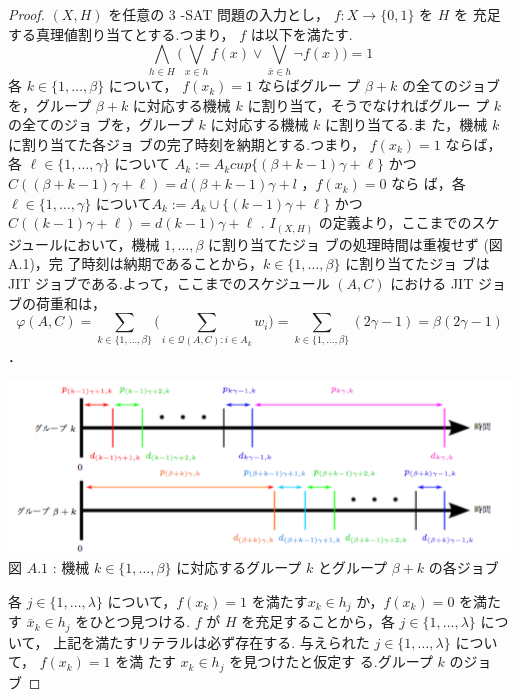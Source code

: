 \documentclass[12pt]{optlab-bachelor}
\begin{document}
\begin{proof}
  $(X,H)$ を任意の 3 -SAT 問題の入力とし， $f : X \to \{0,1\}$ を $H$ を
  充足する真理値割り当てとする.つまり， $f$ は以下を満たす.
  $$\displaystyle \bigwedge_{h \in H} \bigg(\bigvee_{x \in h}f(x) \lor
  \bigvee_{\bar x \in h}\lnot f(x) \bigg) = 1$$
  各 $k \in \{1,\ldots, \beta\}$ について， $f(x_k) = 1$ ならばグルー
  プ $\beta + k$ の全てのジョブを，グループ $\beta + k$ に対応する機械
  $k$ に割り当て，そうでなければグルー
  プ $k$ の全てのジョ ブを，グループ $k$ に対応する機械 $k$ に割り当てる.ま
  た，機械 $k$ に割り当てた各ジョ ブの完了時刻を納期とする.つまり，
  $f(x_k) = 1$ ならば，各 $\ell \in \{1,\ldots,\gamma\}$ について $A_k
  :=A_k cup\{(\beta+k−1)\gamma+\ell\}$ かつ
  $C((\beta+k−1)\gamma+\ell)=d(\beta+k−1)\gamma+l$ ，$f(x_k)=0$ なら
  ば，各 $\ell \in \{1,\ldots,\gamma \}$ について$A_k :=A_k \cup
  \{(k−1)\gamma+\ell \}$ かつ $C((k−1)\gamma+\ell)=d(k−1)\gamma+\ell$
  . $I_{(X,H)}$ の定義より，ここまでのスケジュールにおいて，機械
  $1,\ldots, \beta$ に割り当てたジョ ブの処理時間は重複せず (図 A.1)，完
  了時刻は納期であることから，$k \in \{1,\ldots,\beta\}$ に割り当てたジョ
  ブは JIT ジョブである.よって，ここまでのスケジュール $(A, C)$ における
  JIT ジョブの荷重和は，
  $$\displaystyle \varphi(A,C) = \sum_{k \in
  \{1,\ldots,\beta\}}\bigg(\sum_{i \in \mathcal{Q}(A,C):i \in
  A_k}w_i\bigg) = \sum_{k \in \{1,\ldots,\beta\}}(2\gamma - 1) =
  \beta(2\gamma - 1)$$．
  \begin{center}
    \includegraphics[width = 15cm]{SJIT1.png} \\
    図 $A.1$ : 機械 $k \in \{1,\ldots,\beta\}$ に対応するグループ $k$
    とグループ $\beta + k$ の各ジョブ
  \end{center}
  各 $j\in \{1,\ldots,\lambda\}$ について，$f(x_k)=1$ を満たす$x_k \in
  h_j$ か，$f(x_k)=0$ を満たす $\bar x_k \in h_j$ をひとつ見つける. $f$ が $H$ を充足することから，各 $j \in \{1,\ldots,\lambda\}$ について， 上記を満たすリテラルは必ず存在する.
  与えられた $j \in \{1,\ldots,\lambda \}$ について， $f(x_k) = 1$ を満
  たす $x_k \in h_j$ を見つけたと仮定す る.グループ $k$ のジョブ

\end{proof}
\end{document}
